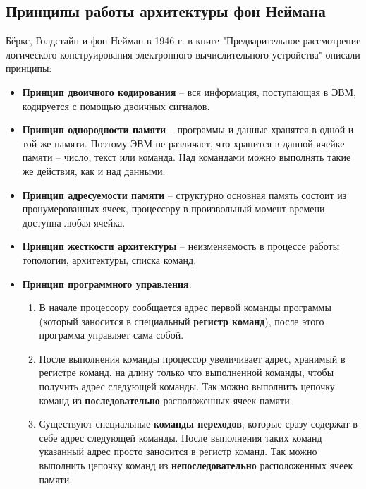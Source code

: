 \subsection{Принципы работы архитектуры фон Неймана}
Бёркс, Голдстайн и фон Нейман в 1946 г. в книге "Предварительное рассмотрение логического конструирования электронного вычислительного устройства"  описали принципы:
\begin{itemize}
  \item \textbf{Принцип двоичного кодирования} -- вся информация, поступающая в ЭВМ, кодируется с помощью двоичных сигналов.
  \item \textbf{Принцип однородности памяти} -- программы и данные хранятся в одной и той же памяти. Поэтому ЭВМ не различает, что хранится в данной ячейке памяти -- число, текст или команда. Над командами можно выполнять такие же действия, как и над данными.
  \item \textbf{Принцип адресуемости памяти} -- структурно основная память состоит из пронумерованных ячеек, процессору в произвольный момент времени доступна любая ячейка.
  \item \textbf{Принцип жесткости архитектуры} -- неизменяемость в процессе работы топологии, архитектуры, списка команд.
  \newpage
  \item \textbf{Принцип программного управления}:
  \begin{enumerate}
    \item В начале процессору сообщается адрес первой команды программы (который заносится в специальный \textbf{регистр команд}), после этого программа управляет сама собой.
    \item После выполнения команды процессор увеличивает адрес, хранимый в регистре команд, на длину только что выполненной команды, чтобы получить адрес следующей команды. Так можно выполнить цепочку команд из \textbf{последовательно} расположенных ячеек памяти.
    \item Существуют специальные \textbf{команды переходов}, которые сразу содержат в себе адрес следующей команды. После выполнения таких команд указанный адрес просто заносится в регистр команд. Так можно выполнить цепочку команд из \textbf{непоследовательно} расположенных ячеек памяти.
  \end{enumerate}
\end{itemize}
